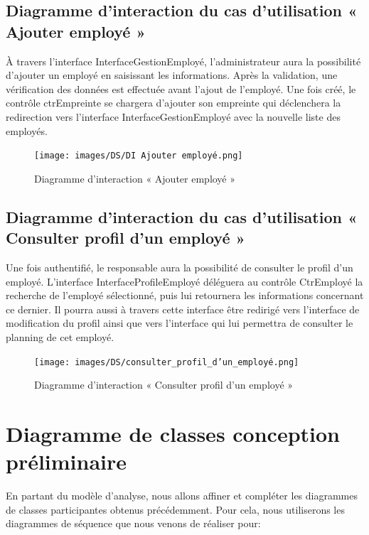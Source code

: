 \subsection*{Diagramme d'interaction du cas d'utilisation « Ajouter employé »}
À travers l’interface InterfaceGestionEmployé, l’administrateur aura la
possibilité d’ajouter un employé en saisissant les informations. Après la
validation, une vérification des données est effectuée avant l’ajout de
l’employé. Une fois créé, le contrôle ctrEmpreinte se chargera d’ajouter son
empreinte qui déclenchera la redirection vers l’interface InterfaceGestionEmployé avec la
nouvelle liste des employés.

\clearpage

\begin{figure}[h!]
    \centering
    \texttt{[image: images/DS/DI Ajouter employé.png]}
    \caption{Diagramme d'interaction « Ajouter employé »}
    \label{fig41}
\end{figure}

\subsection*{Diagramme d'interaction du cas d'utilisation « Consulter profil d'un employé »}
Une fois authentifié, le responsable aura la possibilité de consulter le profil
d’un employé. L’interface InterfaceProfileEmployé déléguera au contrôle
CtrEmployé la recherche de l’employé sélectionné, puis lui retournera les
informations concernant ce dernier. Il pourra aussi à travers cette interface
être redirigé vers l’interface de modification du profil ainsi que vers
l’interface qui lui permettra de consulter le planning de cet employé.
        
\clearpage
        
\begin{figure}[h!]
    \centering
    \texttt{[image: images/DS/consulter\_profil\_d'un\_employé.png]}
    \caption{Diagramme d'interaction « Consulter profil d'un employé »}
    \label{fig42}
\end{figure}
    
\section{Diagramme de classes conception préliminaire}
En partant du modèle d’analyse, nous allons affiner et compléter les diagrammes 
de classes participantes obtenus précédemment. Pour cela, nous utiliserons les 
diagrammes de séquence que nous venons de réaliser pour:

